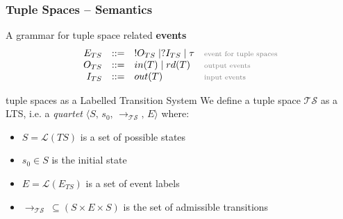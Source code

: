 \documentclass[handout]{beamer}\mode<presentation>{\usetheme{AMSCesenaBleu}}
\begin{document}
\begin{frame}
\frametitle{Tuple Spaces -- Semantics}

    \begin{block}{A grammar for tuple space related \textbf{events}}
        \[\begin{array}{rcll}
            E_{TS} &::=& !O_{TS} \mid ?I_{TS}  \mid \tau & \mathhint{event for tuple spaces} \\
            O_{TS} &::=& in(T) \mid rd(T) & \mathhint{output events} \\
            I_{TS} &::=& out(T) & \mathhint{input events} \\
        \end{array}\]
    \end{block}
    
    \pause

    \begin{block}{ tuple spaces as a Labelled Transition System}
        We define a tuple space $\mathcal{TS}$ as a LTS, i.e. a \emph{quartet} $ \langle S,\, s_0,\, \longrightarrow_\mathcal{TS},\, E \rangle$ where:
        \begin{itemize}
            \item $S = \mathcal{L}(TS)$ is a set of possible \alert{states}
            \item $s_0 \in S$ is the \alert{initial} state
            \item $E = \mathcal{L}(E_{TS})$ is a set of event \alert{labels}
            \item $\longrightarrow_\mathcal{TS}\ \subseteq (S \times E \times S)$ is the set of admissible \alert{transitions}
        \end{itemize}
    \end{block}
    
\end{frame}
\end{document}
